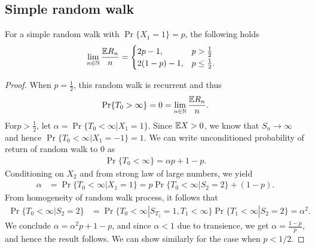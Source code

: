 \documentclass[a4paper,10pt,english]{article}
\begin{document}
\subsection{Simple random walk}
\begin{thm}[range]
For a simple random walk with $\Pr\{X_1 = 1\} = p$, the following holds
\begin{align*}
\lim_{n \in \mathbb{N}}\frac{\mathbb{E} R_n }{n} &= 
	\begin{cases}
2p - 1, & p > \frac{1}{2}\\
2(1-p)-1, & p \leq \frac{1}{2}.
	\end{cases}
\end{align*}
\end{thm}
\begin{proof}
When $p=\frac{1}{2}$, this random walk is recurrent and thus
\begin{align*}
\Pr\{T_0 > \infty\} = 0 = \lim_{n \in \mathbb{N}} \frac{\mathbb{E} R_n}{n}.
\end{align*}
For$p > \frac{1}{2}$, let $\alpha = \Pr\{ T_0 < \infty |X_1 = 1\}$. 
Since $\mathbb{E} X > 0$, we know that $S_n \to \infty$ and hence $\Pr\{T_0  < \infty |X_1 = -1\} = 1$. 
We can write unconditioned probability of return of random walk to $0$ as 
\begin{align*}
\Pr\{T_0 < \infty\} = \alpha p+ 1-p.
\end{align*}
Conditioning on $X_2$ and from strong law of large numbers, we yield
\begin{align*}
\alpha &= \Pr\{T_0 < \infty |X_1 = 1\} = p\Pr\{T_0 < \infty | S_2  = 2\}  + (1-p).
\end{align*}
From homogeneity of random walk process, it follows that 
\begin{align*}
\Pr\{T_0 < \infty | S_2  = 2\} &= \Pr\{T_0 < \infty | S_{T_1} = 1, T_1 < \infty \}\Pr\{T_1 < \infty | S_2 = 2\} = \alpha^2.
\end{align*}
We conclude $\alpha = \alpha^2 p + 1-p$, and since $\alpha < 1$ due to transience, we get $\alpha = \frac{1-p}{p}$, and hence the result follows. We can show similarly for the case when $p < 1/2$.
\end{proof}
\end{document}
